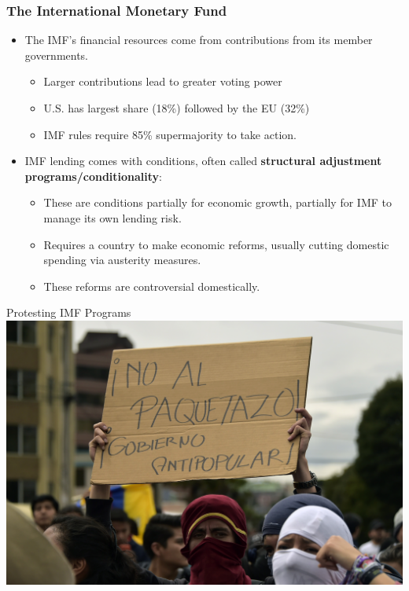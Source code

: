 \documentclass{beamer}
\begin{document}
\begin{frame} 
	\frametitle{\LARGE{The International Monetary Fund}}
	\begin{itemize}
		\item The IMF's financial resources come from contributions from its member governments. \pause 
		\begin{itemize}
			\item Larger contributions lead to greater voting power \pause 
			\item U.S. has largest share (18\%) followed by the EU (32\%) \pause 
			\item IMF rules require 85\% supermajority to take action.
		\end{itemize}
		\item IMF lending comes with conditions, often called \textbf{structural adjustment programs/conditionality}: \pause 
		\begin{itemize}
			\item These are conditions partially for economic growth, partially for IMF to manage its own lending risk. \pause 
			\item Requires a country to make economic reforms, usually cutting domestic spending via austerity measures. \pause 
			\item These reforms are controversial domestically. 
		\end{itemize}
	\end{itemize}
\end{frame}

\begin{frame}{\LARGE Protesting IMF Programs}
    \centering
\includegraphics[width=\textwidth,height=0.8\textheight,keepaspectratio]{ecuador imf.jpg}
\end{frame}
\end{document}
